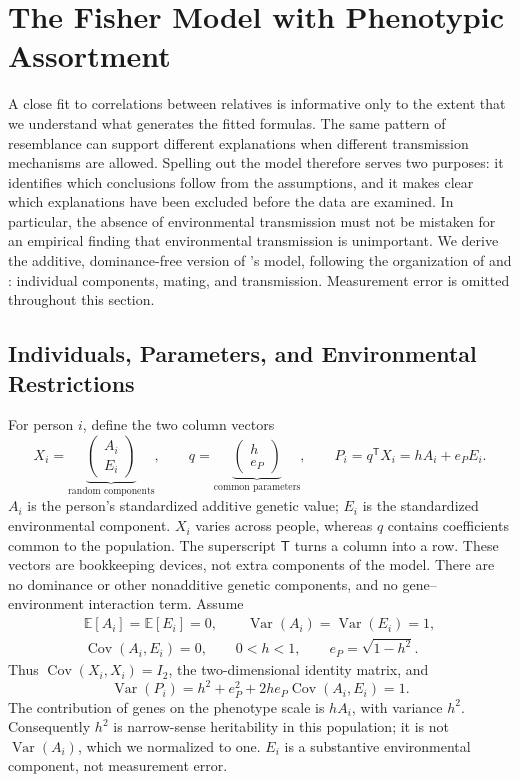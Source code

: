 \section{The Fisher Model with Phenotypic Assortment}
\label{sec:fisher-model}

A close fit to correlations between relatives is informative only to the
extent that we understand what generates the fitted formulas. The same
pattern of resemblance can support different explanations when different
transmission mechanisms are allowed. Spelling out the model therefore
serves two purposes: it identifies which conclusions follow from the
assumptions, and it makes clear which explanations have been excluded
before the data are examined. In particular, the absence of environmental
transmission must not be mistaken for an empirical finding that
environmental transmission is unimportant. We derive the additive,
dominance-free version of \citet{Fisher1918}'s model, following the organization of
\citet{Goldberger1978} and \citet{OttoEtAl1994}: individual components,
mating, and transmission. Measurement error is omitted throughout this
section.

\subsection{Individuals, Parameters, and Environmental Restrictions}
\label{sec:model-components}

For person $i$, define the two column vectors
\[
 X_i=\underbrace{\begin{pmatrix}A_i\\E_i\end{pmatrix}}_{\text{random components}},
 \qquad
 q=\underbrace{\begin{pmatrix}h\\e_P\end{pmatrix}}_{\text{common parameters}},
 \qquad P_i=q^{\mathsf T}X_i=hA_i+e_P E_i.
\]
$A_i$ is the person's standardized additive genetic value; $E_i$ is the
standardized environmental component. $X_i$ varies across people, whereas
$q$ contains coefficients common to the population. The superscript
$\mathsf T$ turns a column into a row. These vectors are bookkeeping
devices, not extra components of the model. There are no dominance or other nonadditive genetic components, and no gene--environment interaction term. Assume
\begin{equation}
 \begin{gathered}
 \mathbb E[A_i]=\mathbb E[E_i]=0,\qquad
 \operatorname{Var}(A_i)=\operatorname{Var}(E_i)=1,\\
 \operatorname{Cov}(A_i,E_i)=0,\qquad
 0<h<1,\qquad e_P=\sqrt{1-h^2}.
 \end{gathered}
 \label{eq:model-raw}
\end{equation}
Thus $\operatorname{Cov}(X_i,X_i)=I_2$, the two-dimensional identity
matrix, and
\[
 \operatorname{Var}(P_i)=h^2+e_P^2+2h e_P\operatorname{Cov}(A_i,E_i)=1.
\]
The contribution of genes on the phenotype scale is $hA_i$, with variance
$h^2$. Consequently $h^2$ is narrow-sense heritability in this population;
it is not $\operatorname{Var}(A_i)$, which we normalized to one.
$E_i$ is a substantive environmental component, not measurement error.

